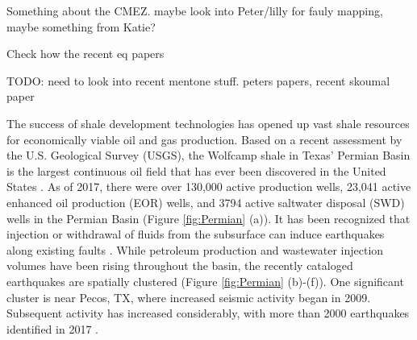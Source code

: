 \documentclass{utexasthesis}
\begin{document}

Something about the CMEZ. maybe look into Peter/lilly for fauly mapping, maybe something from Katie?

Check how the recent eq papers 

TODO: need to look into recent mentone stuff. peters papers, recent skoumal paper



The success of shale development technologies \citep{Waters2006use} has opened up vast shale resources for economically viable oil and gas production. Based on a recent assessment by the U.S. Geological Survey (USGS), the Wolfcamp shale in Texas' Permian Basin is the largest continuous oil field that has ever been discovered in the United States \citep{GaswirthAssessment2016}. As of 2017, there were over 130,000 active production wells, 23,041 active enhanced oil production (EOR) wells, and 3794 active saltwater disposal (SWD) wells in the Permian Basin (Figure \ref{fig:Permian} (a)). It has been recognized that injection or withdrawal of fluids from the subsurface can induce earthquakes along existing faults \citep{Ellsworth2013, simpson1988two}. While petroleum production and wastewater injection volumes have been rising throughout the basin, the recently cataloged earthquakes are spatially clustered (Figure \ref{fig:Permian} (b)-(f)). One significant cluster is near Pecos, TX, where increased seismic activity began in 2009. Subsequent activity has increased considerably, with more than 2000 earthquakes identified in 2017 \citep{Frohlich2019}.
\end{document}
